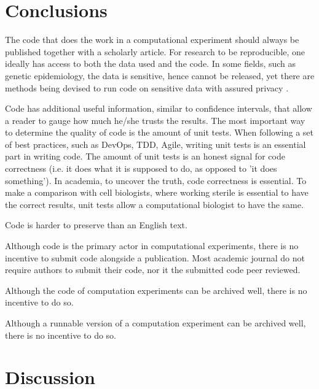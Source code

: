 \section{Conclusions}

The code that does the work in a computational experiment should
always be published together with a scholarly article.
For research to be reproducible, one ideally has access to
both the data used and the code.
In some fields, such as genetic epidemiology, the data is
sensitive, hence cannot be released,
yet there are methods being devised to run code on sensitive
data with assured privacy \cite{zhang2016review,azencott2018machine}.

Code has additional useful information, similar to confidence intervals,
that allow a reader to gauge how much he/she trusts the results.
The most important way to determine the quality of code
is the amount of unit tests.
When following a set of best practices, such as DevOps, TDD, Agile,
writing unit tests is an essential 
part in writing code.
The amount of unit tests is an honest signal 
for code correctness (i.e. it does what it is supposed to do, as opposed
to 'it does something').
In academia, to uncover the truth, code correctness is essential.
To make a comparison with cell biologists, where working
sterile is essential to have the correct results,
unit tests allow a computational biologist to have the same.

Code is harder to preserve than an English text.

Although code is the primary actor in computational experiments,
there is no incentive to submit code alongside a publication.
Most academic journal do not require authors to submit their code,
nor it the submitted code peer reviewed.

Although the code of computation experiments can be archived well, 
there is no incentive to do so.

Although a runnable version of a computation experiment can be archived well, 
there is no incentive to do so.

\section{Discussion}

